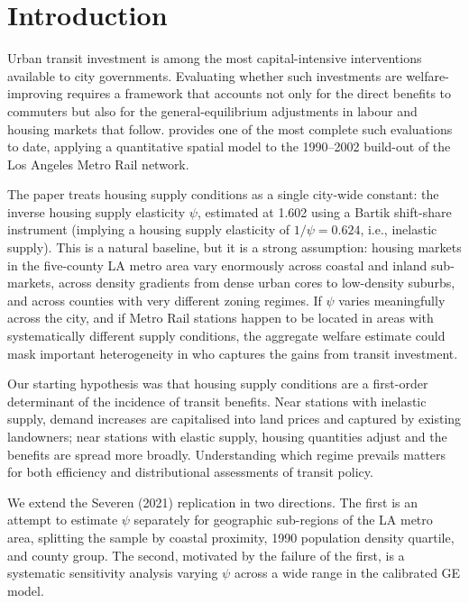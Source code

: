 \documentclass[12pt,a4paper]{article}
\begin{document}
\newpage
\tableofcontents
\newpage

\section{Introduction}
\label{sec:intro}

Urban transit investment is among the most capital-intensive interventions
available to city governments.  Evaluating whether such investments are
welfare-improving requires a framework that accounts not only for the direct
benefits to commuters but also for the general-equilibrium adjustments in labour
and housing markets that follow.  \citet{severen2021} provides one of the most
complete such evaluations to date, applying a quantitative spatial model to the
1990--2002 build-out of the Los Angeles Metro Rail network.

The paper treats housing supply conditions as a single city-wide constant: the
inverse housing supply elasticity $\psi$, estimated at 1.602 using a Bartik
shift-share instrument (implying a housing supply elasticity of
$1/\psi = 0.624$, i.e., inelastic supply).  This is a natural baseline, but it
is a strong assumption: housing markets in the five-county LA metro area vary
enormously across coastal and inland sub-markets, across density gradients from
dense urban cores to low-density suburbs, and across counties with very
different zoning regimes.  If $\psi$ varies meaningfully across the city, and if
Metro Rail stations happen to be located in areas with systematically different
supply conditions, the aggregate welfare estimate could mask important
heterogeneity in who captures the gains from transit investment.

Our starting hypothesis was that housing supply conditions are a first-order
determinant of the incidence of transit benefits.  Near stations with inelastic
supply, demand increases are capitalised into land prices and captured by
existing landowners; near stations with elastic supply, housing quantities adjust
and the benefits are spread more broadly.  Understanding which regime prevails
matters for both efficiency and distributional assessments of transit policy.

We extend the Severen (2021) replication in two directions.  The first is an
attempt to estimate $\psi$ separately for geographic sub-regions of the LA metro
area, splitting the sample by coastal proximity, 1990 population density
quartile, and county group.  The second, motivated by the failure of the first,
is a systematic sensitivity analysis varying $\psi$ across a wide range in the
calibrated GE model.
\end{document}
